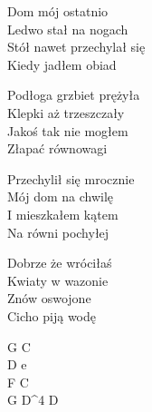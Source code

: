 \begin{text}
    Dom mój ostatnio\\
    Ledwo stał na nogach\\
    Stół nawet przechylał się\\
    Kiedy jadłem obiad

    Podłoga grzbiet prężyła\\
    Klepki aż trzeszczały\\
    Jakoś tak nie mogłem\\
    Złapać równowagi

    Przechylił się mrocznie\\
    Mój dom na chwilę\\
    I mieszkałem kątem\\
    Na równi pochyłej

    Dobrze że wróciłaś\\
    Kwiaty w wazonie\\
    Znów oswojone\\
    Cicho piją wodę
\end{text}
\begin{chord}
    G C\\
    D e\\
    F C\\
    G D^4 D
\end{chord}